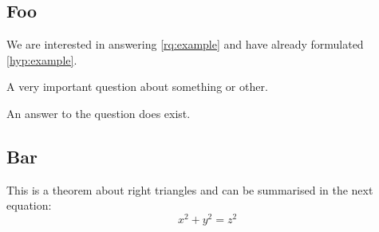 \clearpage

\subsection{Foo}
\label{subsec:example.another_foo}

We are interested in answering \ref{rq:example} and have already formulated \ref{hyp:example}.

\begin{researchquestion}
	\label{rq:example}
	A very important question about something or other.
\end{researchquestion}

\begin{hypothesis}
	\label{hyp:example}
	An answer to the question does exist.
\end{hypothesis}




\subsection{Bar}
\label{subsec:example.another_bar}

\begin{table}[h]
	\centering
	\caption{\textit{Some important numbers}}
	\small{
		\renewcommand{\arraystretch}{1.4} 
		{%
			}}
	\label{tab:example.a}
\end{table}


\begin{theorem}
	\label{the:example.pythagorean}
	This is a theorem about right triangles and can be summarised in the next 
	equation: 
	\[ x^2 + y^2 = z^2 \]
\end{theorem}

